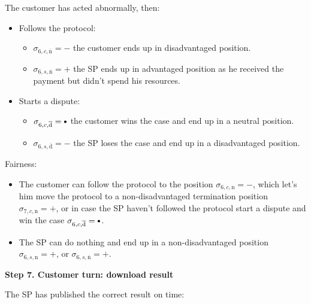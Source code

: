 \documentclass{ieeeaccess}
\newcommand\sbullet[1][.75]{\mathbin{\ThisStyle{\vcenter{\hbox{%
  \scalebox{#1}{$\SavedStyle\bullet$}}}}}%
}
\begin{document}
The customer has acted abnormally, then:

\begin{itemize}
\item
  Follows the protocol:

  \begin{itemize}
  
  \item
    \(\sigma_{6, c, \overline{\mathrm{n}}} = -\) the customer ends up in
    disadvantaged position.
  \item
    \(\sigma_{6, s, \overline{\mathrm{n}}} = +\) the SP ends up in
    advantaged position as he received the payment but didn't spend his
    resources.
  \end{itemize}
\item
  Starts a dispute:

  \begin{itemize}
  
  \item
    \(\sigma_{6, c, \overline{\mathrm{d}}} = \sbullet\) the customer wins the
    case and end up in a neutral position.
  \item
    \(\sigma_{6, s, \overline{\mathrm{d}}} = -\) the SP loses the case
    and end up in a disadvantaged position.
  \end{itemize}
\end{itemize}

Fairness:

\begin{itemize}

\item
  The customer can follow the protocol to the position
  \(\sigma_{6, c, \mathrm{n}} = -\), which let's him move the protocol
  to a non-disadvantaged termination position
  \(\sigma_{7, c, \mathrm{n}} = +\), or in case the SP haven't followed
  the protocol start a dispute and win the case
  \(\sigma_{6, c, \overline{\mathrm{d}}} = \sbullet\).
\item
  The SP can do nothing and end up in a non-disadvantaged position
  \(\sigma_{6, s, \mathrm{n}} = +\), or
  \(\sigma_{6, s, \overline{\mathrm{n}}} = +\).
\end{itemize}

\noindent \textbf
{Step 7. Customer turn: download result}\label{step-7-retrieval-of-results}

The SP has published the correct result on time:
\end{document}

